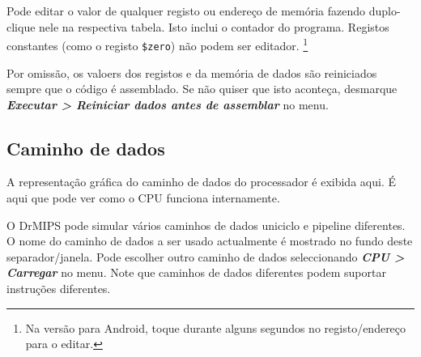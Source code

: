 \documentclass[11pt,a4paper,twoside,titlepage]{article}
\newcommand{\menupath}[1]{\textbf{\emph{#1}}}
\begin{document}
Pode editar o valor de qualquer registo ou endereço de memória fazendo 
duplo-clique nele na respectiva tabela. Isto inclui o contador do programa.
Registos constantes (como o registo \verb+$zero+) não podem ser editador.
\footnote{Na versão para Android, toque durante alguns segundos no
registo/endereço para o editar.}

Por omissão, os valoers dos registos e da memória de dados são reiniciados
sempre que o código é assemblado.
Se não quiser que isto aconteça, desmarque 
\menupath{Executar > Reiniciar dados antes de assemblar} no menu.


\subsection{Caminho de dados}

A representação gráfica do caminho de dados do processador é exibida aqui.
É aqui que pode ver como o CPU funciona internamente.

O DrMIPS pode simular vários caminhos de dados uniciclo e pipeline diferentes.
O nome do caminho de dados a ser usado actualmente é mostrado no fundo deste
separador/janela. Pode escolher outro caminho de dados seleccionando
\menupath{CPU > Carregar} no menu.
Note que caminhos de dados diferentes podem suportar instruções diferentes.
\end{document}
